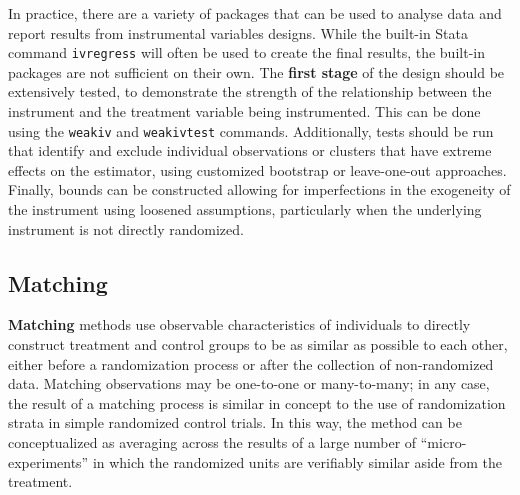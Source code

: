 In practice, there are a variety of packages that can be used
to analyse data and report results from instrumental variables designs.
While the built-in Stata command \texttt{ivregress} will often be used
to create the final results, the built-in packages are not sufficient on their own.
The \textbf{first stage} of the design should be extensively tested,
to demonstrate the strength of the relationship between
the instrument and the treatment variable being instrumented.\cite{stock2005weak}
This can be done using the \texttt{weakiv} and \texttt{weakivtest} commands.
Additionally, tests should be run that identify and exclude individual
observations or clusters that have extreme effects on the estimator,
using customized bootstrap or leave-one-out approaches.\cite{young2017consistency}
Finally, bounds can be constructed allowing for imperfections
in the exogeneity of the instrument using loosened assumptions,
particularly when the underlying instrument is not directly randomized.


\subsection{Matching}

\textbf{Matching} methods use observable characteristics of individuals
to directly construct treatment and control groups to be as similar as possible
to each other, either before a randomization process
or after the collection of non-randomized data.
Matching observations may be one-to-one or many-to-many;
in any case, the result of a matching process
is similar in concept to the use of randomization strata
in simple randomized control trials.
In this way, the method can be conceptualized
as averaging across the results of a large number of ``micro-experiments''
in which the randomized units are verifiably similar aside from the treatment.

